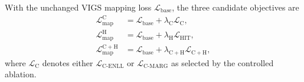 With the unchanged VIGS mapping loss $\mathcal L_{\mathrm{base}}$, the three
candidate objectives are
\begin{equation}\label{eq:geometry_objectives}
  \begin{aligned}
  \mathcal L_{\mathrm{map}}^{\mathrm C}
    &=\mathcal L_{\mathrm{base}}+\lambda_{\mathrm C}\mathcal L_{\mathrm C},\\
  \mathcal L_{\mathrm{map}}^{\mathrm H}
    &=\mathcal L_{\mathrm{base}}+\lambda_{\mathrm H}\mathcal L_{\mathrm{HIT}},\\
  \mathcal L_{\mathrm{map}}^{\mathrm{C+H}}
    &=\mathcal L_{\mathrm{base}}+\lambda_{\mathrm{C+H}}\mathcal L_{\mathrm{C+H}},
  \end{aligned}
\end{equation}
where $\mathcal L_{\mathrm C}$ denotes either
$\mathcal L_{\mathrm{C\text{-}ENLL}}$ or
$\mathcal L_{\mathrm{C\text{-}MARG}}$ as selected by the controlled ablation.


